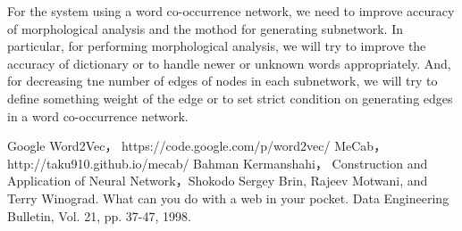 \documentclass{../style/sig-alternate}
\begin{document}
For the system using a word co-occurrence network, we need to improve accuracy of morphological analysis and the mothod for generating subnetwork.
In particular, for performing morphological analysis, we will try to improve the accuracy of dictionary or to handle newer or unknown words appropriately. And, for decreasing tne number of edges of nodes in each subnetwork, we will try to define something weight of the edge or to set strict condition on generating edges in a word co-occurrence network.

\begin{thebibliography}{99}

 Google Word2Vec， https://code.google.com/p/word2vec/
 MeCab， http://taku910.github.io/mecab/
 Bahman Kermanshahi， Construction and Application of Neural Network，Shokodo
 Sergey Brin, Rajeev Motwani, and Terry Winograd. What can you do with a
web in your pocket. Data Engineering Bulletin, Vol. 21, pp. 37-47, 1998.

\end{thebibliography}
\end{document}
